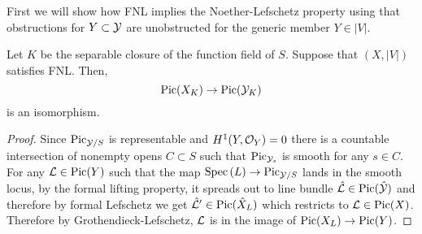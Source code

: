 \documentclass[12pt]{article}
\begin{document}
First we will show how FNL implies the Noether-Lefschetz property using that obstructions for $Y \subset \mathcal{Y}$ are unobstructed for the generic member $Y \in |V|$.

\begin{theorem}
Let $K$ be the separable closure of the function field of $S$. Suppose that $(X, |V|)$ satisfies FNL. Then,
\[ \mathrm{Pic}(X_K) \to \mathrm{Pic}(\mathcal{Y}_K) \]
is an isomorphism.
\end{theorem}

\begin{proof}
Since $\mathrm{Pic}_{\mathcal{Y}/S}$ is representable and $H^1(Y, \mathcal{O}_{Y}) = 0$ there is a countable intersection of nonempty opens $C \subset S$ such that $\mathrm{Pic}_{\mathcal{Y}_s}$ is smooth for any $s \in C$. For any $\mathcal{L} \in \mathrm{Pic}(Y)$ such that the map  $\mathrm{Spec}\left( L \right) \to \mathrm{Pic}_{\mathcal{Y}/S}$ lands in the smooth locus, by the formal lifting property, it spreads out to line bundle $\hat{\mathcal{L}} \in \mathrm{Pic}(\hat{\mathcal{Y}})$ and therefore by formal Lefschetz we get $\hat{\mathcal{L}}' \in \mathrm{Pic}(\hat{X}_L)$ which restricts to $\mathcal{L} \in \mathrm{Pic}(X)$. Therefore by Grothendieck-Lefschetz, $\mathcal{L}$ is in the image of $\mathrm{Pic}(X_L) \to \mathrm{Pic}(Y)$.
\end{proof}
\end{document}
